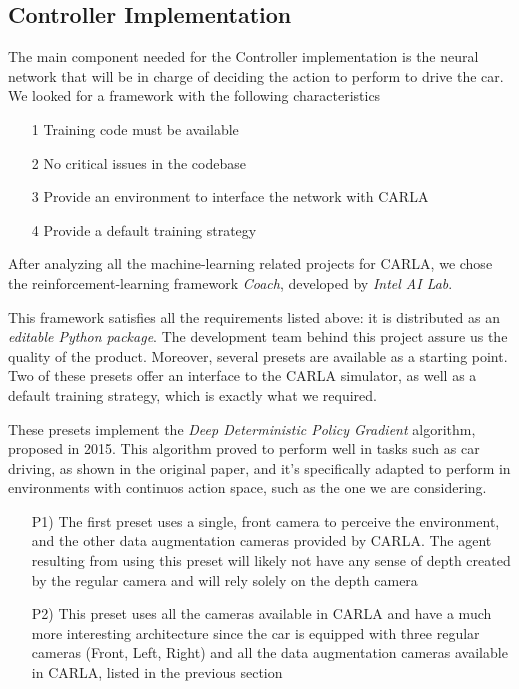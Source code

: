 \subsection{Controller Implementation}

The main component needed for the Controller implementation is the neural network that will be in charge of deciding the action to perform to drive the car. We looked for a framework with the following characteristics

\begin{itemize}
	\item[1] Training code must be available
	\item[2] No critical issues in the codebase
	\item[3] Provide an environment to interface the network with CARLA
	\item[4] Provide a default training strategy
\end{itemize}

After analyzing all the machine-learning related projects for CARLA, we chose the reinforcement-learning framework \textsl{Coach}, developed by \textsl{Intel AI Lab}.\cite{coach}

This framework satisfies all the requirements listed above: it is distributed as an \textsl{editable Python package}. The development team behind this project assure us the quality of the product. Moreover, several presets are available as a starting point. Two of these presets offer an interface to the CARLA simulator, as well as a default training strategy, which is exactly what we required.

These presets implement the \textsl{Deep Deterministic Policy Gradient} algorithm, proposed in 2015.\cite{ddpg} This algorithm proved to perform well in tasks such as car driving, as shown in the original paper, and it's specifically adapted to perform in environments with continuos action space, such as the one we are considering.

\begin{itemize}
	\item[P1)] The first preset uses a single, front camera to perceive the environment, and the other data augmentation cameras provided by CARLA. The agent resulting from using this preset will likely not have any sense of depth created by the regular camera and will rely solely on the depth camera
	\item[P2)] This preset uses all the cameras available in CARLA and have a much more interesting architecture since the car is equipped with three regular cameras (Front, Left, Right) and all the data augmentation cameras available in CARLA, listed in the previous section
\end{itemize}

